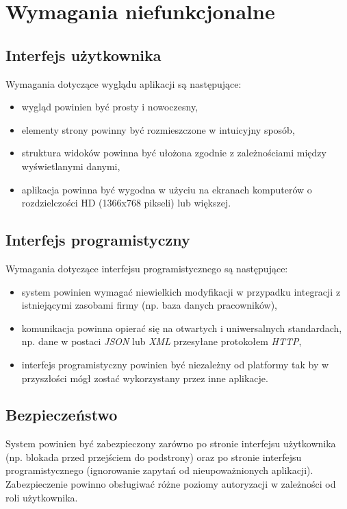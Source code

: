 \documentclass[eng,printmode,openany]{mgr}
\begin{document}
	
	
	\section{Wymagania niefunkcjonalne}
	\subsection{Interfejs użytkownika}
	Wymagania dotyczące wyglądu aplikacji są następujące:
	\begin{itemize}
		\item wygląd powinien być prosty i nowoczesny,
		\item elementy strony powinny być rozmieszczone w intuicyjny sposób,
		\item struktura widoków powinna być ułożona zgodnie z zależnościami między wyświetlanymi danymi,
		\item aplikacja powinna być wygodna w użyciu na ekranach komputerów o rozdzielczości HD (1366x768 pikseli) lub większej.
	\end{itemize}
	\newpage
	\subsection{Interfejs programistyczny}
	Wymagania dotyczące interfejsu programistycznego są następujące:
	\begin{itemize}
		\item system powinien wymagać niewielkich modyfikacji w przypadku integracji z istniejącymi zasobami firmy (np. baza danych pracowników),
		\item komunikacja powinna opierać się na otwartych i uniwersalnych standardach, np. dane w postaci \textit{JSON} lub \textit{XML} przesyłane protokołem \textit{HTTP},
		\item interfejs programistyczny powinien być niezależny od platformy tak by w przyszłości mógł zostać wykorzystany przez inne aplikacje.
	\end{itemize}
	\subsection{Bezpieczeństwo}
	System powinien być zabezpieczony zarówno po stronie interfejsu użytkownika (np. blokada przed przejściem do podstrony) oraz po stronie interfejsu programistycznego (ignorowanie zapytań od nieupoważnionych aplikacji). Zabezpieczenie powinno obsługiwać różne poziomy autoryzacji w zależności od roli użytkownika.
	
\end{document}
